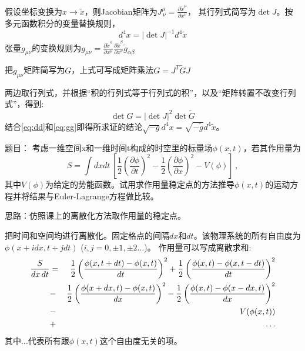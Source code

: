 \documentclass[CJK]{beamer}
\begin{document}
\begin{frame}
\bch
假设坐标变换为$x \rightarrow \tilde{x}$，则Jacobian矩阵为$J^\mu_{\,\nu} = \frac{\partial \tilde{x}^\mu}{\partial x^\nu}$， 其行列式简写为$\det{J}$。按多元函数积分的变量替换规则，
\begin{equation}
 d^4x = |\det{J}|^{-1} d^4\tilde{x} \label{eq:dd}
\end{equation}
张量$g_{\mu\nu}$的变换规则为$ g_{\mu\nu} =  \frac{\partial \tilde{x}^\alpha}{\partial x^\mu} \frac{\partial \tilde{x}^\beta}{\partial x^\nu} \tilde{g}_{\alpha\beta} $

把$g_{\mu\nu}$矩阵简写为$G$，上式可写成矩阵乘法$ G = J^T \tilde{G} J$

两边取行列式，并根据“积的行列式等于行列式的积”，以及“矩阵转置不改变行列式”，得到:
\begin{equation}
\det{G} = |\det{J}|^2 \det{\tilde{G}} \label{eq:gg}
\end{equation}
结合\eqref{eq:dd}和\eqref{eq:gg}即得所求证的结论$\sqrt{-g}d^4x = \sqrt{-\tilde{g}}d^4\tilde{x}$。

\ech
\end{frame}



\begin{frame}
\bch
题目： 考虑一维空间x和一维时间t构成的时空里的标量场$\phi(x,t)$，若其作用量为
$$ S = \int dx dt \, \left[   \frac{1}{2}\left(\frac{\partial \phi}{\partial t}\right)^2 -    \frac{1}{2}\left(\frac{\partial \phi}{\partial x}\right)^2 - V(\phi)\right]\, ,$$
其中$V(\phi)$为给定的势能函数。试用求作用量稳定点的方法推导$\phi(x, t)$的运动方程并将结果与Euler-Lagrange方程做比较。

\skipline
思路：仿照课上的离散化方法取作用量的稳定点。
\ech
\end{frame}

\begin{frame}
\bch
把时间和空间均进行离散化。固定格点的间隔$dx$和$dt$。该物理系统的所有自由度为$\phi(x+idx, t+j dt)$ ($i, j = 0, \pm 1, \pm 2\ldots$)。
作用量可以写成离散求和:
\begin{eqnarray}
\frac{S}{dx\,dt} &=& \frac{1}{2}\left(\frac{\phi(x, t+dt) - \phi(x,t)}{dt}\right)^2 + \frac{1}{2}\left(\frac{\phi(x, t) - \phi(x,t-dt)}{dt}\right)^2 \nonumber \\
 &-&\frac{1}{2}\left(\frac{\phi(x+dx, t) - \phi(x,t)}{dx}\right)^2 - \frac{1}{2}\left(\frac{\phi(x, t) - \phi(x-dx,t)}{dx}\right)^2 \nonumber \\
 &-& V(\phi(x, t)) \nonumber \\
 &+&\ldots \nonumber
\end{eqnarray}
其中$\ldots$代表所有跟$\phi(x, t)$这个自由度无关的项。
\ech
\end{frame}
\end{document}
